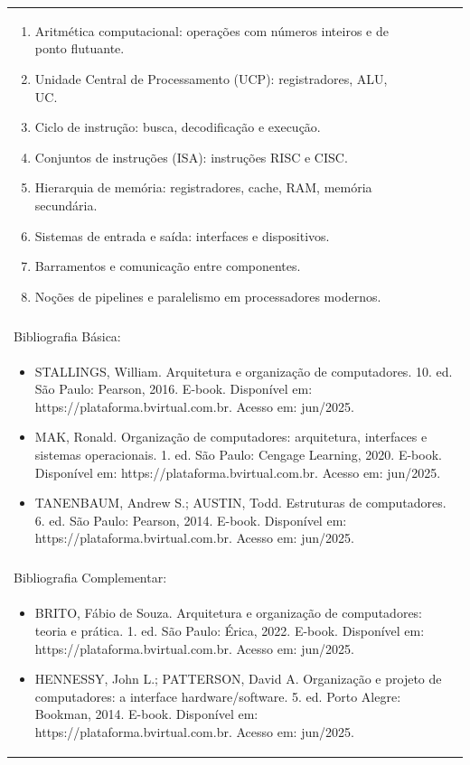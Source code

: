 \documentclass[11pt]{article}
\begin{document}
\begin{center}
\begin{longtable}{|p{4cm}|p{4cm}|p{4cm}|p{4cm}|}
{\begin{enumerate}
\item Aritmética computacional: operações com números inteiros e de ponto flutuante.
\item Unidade Central de Processamento (UCP): registradores, ALU, UC.
\item Ciclo de instrução: busca, decodificação e execução.
\item Conjuntos de instruções (ISA): instruções RISC e CISC.
\item Hierarquia de memória: registradores, cache, RAM, memória secundária.
\item Sistemas de entrada e saída: interfaces e dispositivos.
\item Barramentos e comunicação entre componentes.
\item Noções de pipelines e paralelismo em processadores modernos.\end{enumerate}}\\
\multicolumn{4}{|p{16cm}|}{}\\
\hline
\multicolumn{4}{|p{16cm}|}{Bibliografia Básica:}\\
\multicolumn{4}{|p{\dimexpr 16cm + 6\tabcolsep\relax}|}{%
\begin{itemize}\item STALLINGS, William. Arquitetura e organização de computadores. 10. ed. São Paulo: Pearson, 2016. E-book. Disponível em: https://plataforma.bvirtual.com.br. Acesso em: jun/2025.
\item MAK, Ronald. Organização de computadores: arquitetura, interfaces e sistemas operacionais. 1. ed. São Paulo: Cengage Learning, 2020. E-book. Disponível em: https://plataforma.bvirtual.com.br. Acesso em: jun/2025.
\item TANENBAUM, Andrew S.; AUSTIN, Todd. Estruturas de computadores. 6. ed. São Paulo: Pearson, 2014. E-book. Disponível em: https://plataforma.bvirtual.com.br. Acesso em: jun/2025.\end{itemize}}\\
\multicolumn{4}{|p{16cm}|}{}\\
\hline
\multicolumn{4}{|p{16cm}|}{Bibliografia Complementar:}\\
\multicolumn{4}{|p{\dimexpr 16cm + 6\tabcolsep\relax}|}{%
\begin{itemize}\item BRITO, Fábio de Souza. Arquitetura e organização de computadores: teoria e prática. 1. ed. São Paulo: Érica, 2022. E-book. Disponível em: https://plataforma.bvirtual.com.br. Acesso em: jun/2025.
\item HENNESSY, John L.; PATTERSON, David A. Organização e projeto de computadores: a interface hardware/software. 5. ed. Porto Alegre: Bookman, 2014. E-book. Disponível em: https://plataforma.bvirtual.com.br. Acesso em: jun/2025.

\end{itemize}}
\end{longtable}
\end{center}
\end{document}
